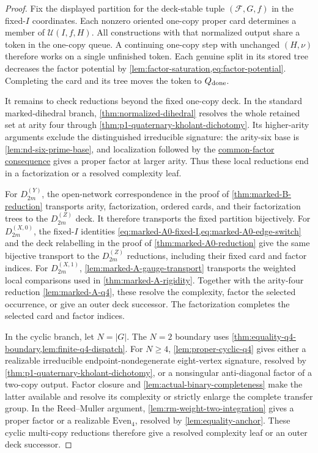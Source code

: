 \documentclass[11pt,letterpaper,onecolumn]{article}
\theoremstyle{plain}
\theoremstyle{definition}
\theoremstyle{remark}
\newcommand{\cF}{\mathcal F}
\newcommand{\DihZ}[1]{{D_{#1}^{(Z)}}}
\newcommand{\DihY}[1]{{D_{#1}^{(Y)}}}
\newcommand{\DihXzero}[1]{{D_{#1}^{(X,0)}}}
\newcommand{\DihXone}[1]{{D_{#1}^{(X,1)}}}
\begin{document}
\begin{proof}
Fix the displayed partition for the deck-stable tuple \((\cF,G,f)\) in
the fixed-\(I\) coordinates. Each nonzero oriented one-copy proper card
determines a member of \(\mathscr U(I,f,H)\). All constructions with that
normalized output share a token in the one-copy queue. A continuing
one-copy step with unchanged \((H,\nu)\) therefore works on a single
unfinished token. Each genuine split in its stored tree decreases the
factor potential by \cref{lem:factor-saturation,eq:factor-potential}.
Completing the card and its tree moves the token to \(Q_{\rm done}\).

It remains to check reductions beyond the fixed one-copy deck.
In the standard marked-dihedral branch, \cref{thm:normalized-dihedral}
resolves the whole retained set at arity four through
\cref{thm:p1-quaternary-kholant-dichotomy}. Its higher-arity arguments
exclude the distinguished irreducible signature: the arity-six base is
\cref{lem:nd-six-prime-base}, and localization followed by the
\hyperref[par:nd-common-factor-consequence]{common-factor consequence}
gives a proper factor at larger arity. Thus these local reductions end in
a factorization or a resolved complexity leaf.

For \(\DihY{2m}\), the open-network correspondence in
the proof of \cref{thm:marked-B-reduction} transports arity, factorization, ordered
cards, and their factorization trees to the \(\DihZ{2m}\) deck.
It therefore transports the fixed partition bijectively. For \(\DihXzero{2m}\), the
fixed-\(I\) identities \cref{eq:marked-A0-fixed-I,eq:marked-A0-edge-switch}
and the deck relabelling in the proof of
\cref{thm:marked-A0-reduction} give the same bijective transport to the
\(\DihZ{2m}\) reductions, including their fixed card and factor indices.
For \(\DihXone{2m}\), \cref{lem:marked-A-gauge-transport}
transports the weighted local comparisons used in
\cref{thm:marked-A-rigidity}. Together with the arity-four reduction
\cref{lem:marked-A-q4}, these resolve the complexity, factor the selected
occurrence, or give an outer deck successor. The factorization completes
the selected card and factor indices.

In the cyclic branch, let \(N=|G|\). The \(N=2\) boundary uses
\cref{thm:equality-q4-boundary,lem:finite-q4-dispatch}.
For \(N\ge4\), \cref{lem:proper-cyclic-q4} gives either
a realizable irreducible endpoint-nondegenerate eight-vertex signature,
resolved by \cref{thm:p1-quaternary-kholant-dichotomy}, or a nonsingular
anti-diagonal factor of a two-copy output. Factor closure and
\cref{lem:actual-binary-completeness} make the latter available and resolve
its complexity or strictly enlarge the complete transfer group.
In the Reed--Muller argument, \cref{lem:rm-weight-two-integration} gives
a proper factor or a realizable \(\mathrm{Even}_4\), resolved by
\cref{lem:equality-anchor}. These cyclic multi-copy reductions therefore
give a resolved complexity leaf or an outer deck successor.


\end{proof}
\end{document}
